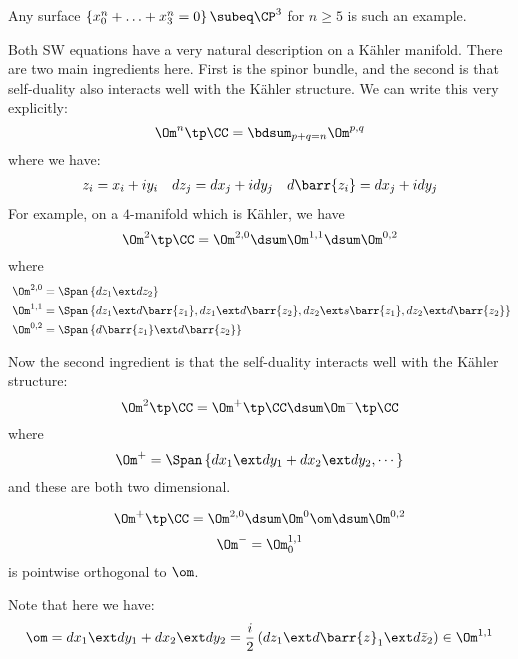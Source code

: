 \documentclass{amsart}
\begin{document}
\begin{exm}
Any surface $\left\{ x_0^n + \ldots + x_3^n = 0 \right\} \subeq \CP^3$ for $n\geq 5$ is such an example.
\end{exm}

Both SW equations have a very natural description on a K\"ahler manifold. 
There are two main ingredients here. 
First is the spinor bundle, and the second is that self-duality also
interacts well with the K\"ahler structure.
We can write this very explicitly:
\begin{equation}
\Om^n \tp \CC = \bdsum_{p + q = n} \Om^{p,q}
\end{equation}
where we have:
\begin{align}
z_i = x_i + i y_i &&
dz_j = dx_j + i dy_j &&
d\barr{z_i} = dx_j + i dy_j
\end{align}
For example, on a $4$-manifold which is K\"ahler, we have
\begin{equation}
\Om^2 \tp \CC = \Om^{2,0} \dsum \Om^{1,1} \dsum \Om^{0,2}
\end{equation}
where
\begin{align}
\Om^{2,0} &= \Span\left\{ dz_1 \ext dz_2 \right\} \\\
\Om^{1,1} &= \Span\left\{ dz_1 \ext d\barr{z_1} , 
dz_1 \ext d\barr{z_2} , 
d z_2 \ext s\barr{z_1},
dz_2 \ext d\barr{z_2}\right\} \\
\Om^{0,2} &=
\Span\left\{ d\barr{z_1} \ext d \barr{z_2} \right\}
\end{align}

Now the second ingredient is that the self-duality 
interacts well with the K\"ahler structure:
\begin{equation}
\Om^2 \tp \CC = \Om^+ \tp \CC \dsum \Om^- \tp \CC
\end{equation}
where 
\begin{equation}
\Om^+  = \Span\left\{ d x_1 \ext d y_1 + dx_2 \ext d y_2 , \cdots\right\}
\end{equation}
and these are both two dimensional.

\begin{lem}
\begin{equation}
\Om^+ \tp \CC = 
\Om^{2,0} \dsum \Om^0 \om \dsum
\Om^{0,2}
\end{equation}
\begin{equation}
\Om^- = \Om_0^{1,1}
\end{equation}
is pointwise orthogonal to $\om$.
\end{lem}

Note that here we have:
\begin{equation}
\om = dx_1 \ext dy_1 + dx_2 \ext d y_2 = 
\frac{i}{2}\left( dz_1 \ext d\barr{z}_1 \ext d\bar{z}_2 \right) \in
\Om^{1,1}
\end{equation}
\end{document}
